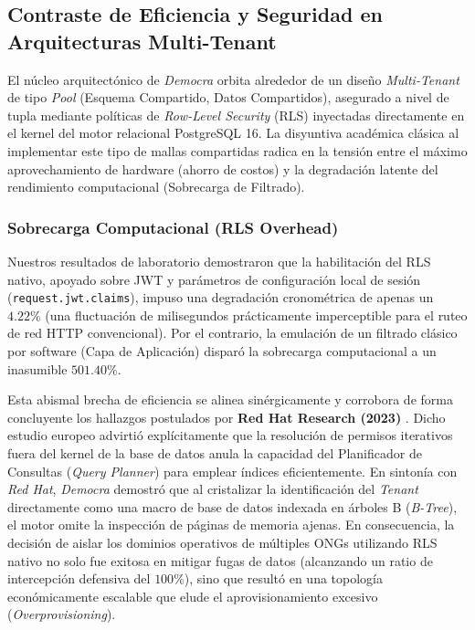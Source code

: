 \subsection{Contraste de Eficiencia y Seguridad en Arquitecturas Multi-Tenant}

El n\'ucleo arquitect\'onico de \textit{Democra} orbita alrededor de un dise\~no \textit{Multi-Tenant} de tipo \textit{Pool} (Esquema Compartido, Datos Compartidos), asegurado a nivel de tupla mediante pol\'iticas de \textit{Row-Level Security} (RLS) inyectadas directamente en el kernel del motor relacional PostgreSQL 16. La disyuntiva acad\'emica cl\'asica al implementar este tipo de mallas compartidas radica en la tensi\'on entre el m\'aximo aprovechamiento de hardware (ahorro de costos) y la degradaci\'on latente del rendimiento computacional (Sobrecarga de Filtrado).

\subsubsection{Sobrecarga Computacional (RLS Overhead)}
Nuestros resultados de laboratorio demostraron que la habilitaci\'on del RLS nativo, apoyado sobre JWT y par\'ametros de configuraci\'on local de sesi\'on (\texttt{request.jwt.claims}), impuso una degradaci\'on cronom\'etrica de apenas un $4.22\%$ (una fluctuaci\'on de milisegundos pr\'acticamente imperceptible para el ruteo de red HTTP convencional). Por el contrario, la emulaci\'on de un filtrado cl\'asico por software (Capa de Aplicaci\'on) dispar\'o la sobrecarga computacional a un inasumible $501.40\%$.

Esta abismal brecha de eficiencia se alinea sin\'ergicamente y corrobora de forma concluyente los hallazgos postulados por \textbf{Red Hat Research (2023)} \citep{redhat2023}. Dicho estudio europeo advirti\'o expl\'icitamente que la resoluci\'on de permisos iterativos fuera del kernel de la base de datos anula la capacidad del Planificador de Consultas (\textit{Query Planner}) para emplear \'indices eficientemente. En sinton\'ia con \textit{Red Hat}, \textit{Democra} demostr\'o que al cristalizar la identificaci\'on del \textit{Tenant} directamente como una macro de base de datos indexada en \'arboles B (\textit{B-Tree}), el motor omite la inspecci\'on de p\'aginas de memoria ajenas. En consecuencia, la decisi\'on de aislar los dominios operativos de m\'ultiples ONGs utilizando RLS nativo no solo fue exitosa en mitigar fugas de datos (alcanzando un ratio de intercepci\'on defensiva del $100\%$), sino que result\'o en una topolog\'ia econ\'omicamente escalable que elude el aprovisionamiento excesivo (\textit{Overprovisioning}).
